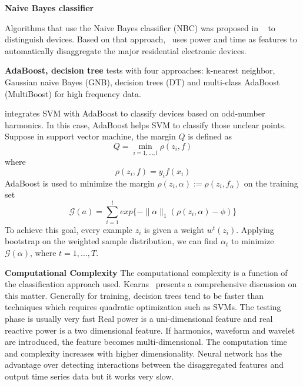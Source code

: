 \textbf{Naive Bayes classifier}

Algorithms that use the Naive Bayes classifier (NBC) was proposed in ~\cite{zeifman2012disaggregation} to distinguish devices. 
Based on that approach,~\cite{zeifman2013automatic} uses power and time as features to automatically disaggregate the major residential electronic devices. 

\textbf{AdaBoost, decision tree}
\cite{berges2009learning} tests with four approaches:
k-nearest neighbor, Gaussian naive Bayes (GNB),
decision trees (DT) and multi-class AdaBoost (MultiBoost)
for high frequency data.

\cite{onoda2000applying} integrates SVM with AdaBoost to classify devices
based on odd-number harmonics.
In this case, AdaBoost helps SVM to classify those unclear points.
Suppose in support vector machine,
the margin $Q$ is defined as
\begin{equation}
Q= \min_{i=1,...,l}\rho(z_i,f)
\end{equation}
where
\begin{equation}
\rho(z_i,f)= y_i f(x_i)
\end{equation}
AdaBoost is used to minimize the margin
$\rho(z_i,\alpha):=\rho(z_i, f_\alpha)$ on the training set
\begin{equation}
\mathscr{G}(a)= \sum_{i=1}^l exp\{-\lVert \alpha \rVert_1 (\rho(z_i, \alpha)-\phi)\}
\end{equation}
To achieve this goal, every example $z_i$ is
given a weight $w^t(z_i)$.
Applying bootstrap on the weighted sample distribution,
we can find $\alpha_t$ to minimize $\mathscr{G}(\alpha)$, 
where $t=1,...,T$. 


\textbf{Computational Complexity}
The computational complexity is a function of the classification approach used. 
Kearns~\cite{kearns1990complexity} presents a comprehensive discussion on this matter. 
Generally for training, decision trees tend to be faster than 
techniques which requires quadratic optimization such as SVMs. 
The testing phase is usually very fast 
Real power is a uni-dimensional feature and real reactive power is a two dimensional feature. 
If harmonics, waveform and wavelet are introduced, the feature becomes multi-dimensional.
The computation time and complexity increases with higher dimensionality. 
Neural network has the advantage over detecting interactions between
the disaggregated features and output time series data
but it works very slow.


